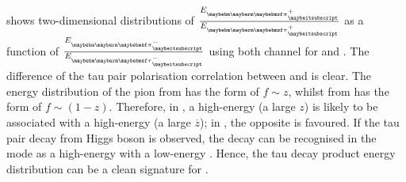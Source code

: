  shows two-dimensional distributions of  $\frac{E_{\Ppiplus}}{E_{\APtauon}}$ as a function of $\frac{E_{\Ppiminus}}{E_{\Ptauon}}$ using both \tauToPion channel for \ZToTauTau and \HiggsToTauTau. The difference of the tau pair polarisation correlation between \PZ and \PHiggs  is clear. The energy distribution of the pion from \ZToTauTau has the form of $f\sim z$, whilst from  \HiggsToTauTau has the form of $f\sim (1-z)$. Therefore, in \ZToTauTau, a high-energy \Pgppm (a large $z$) is likely to be associated with a high-energy \Pgpmp (a large $\overline{z} $); in \HiggsToTauTau, the opposite is favoured. If the tau pair decay from Higgs boson is observed, the decay can be recognised in the \tauToPion mode as a high-energy \Pgppm with a low-energy \Pgpmp. Hence, the tau decay product energy distribution can be a clean signature for \HiggsToTauTau.


